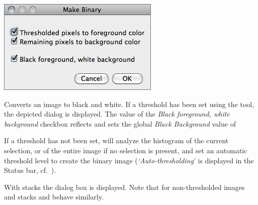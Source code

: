 \begin{minipage}[c][1\totalheight][t]{0.411\columnwidth}%
\includegraphics[scale=0.55]{images/MakeBinary}%
\end{minipage}%
\begin{minipage}[c][1\totalheight][t]{0.589\columnwidth}%
Converts an image to black and white. If a threshold has been set
using the 
tool, the depicted dialog is displayed. The value of the \emph{Black
foreground, white background} checkbox reflects and sets the global
\emph{Black Background} value of %
\end{minipage}\medskip{}


If a threshold has not been set, 
will analyze the histogram of the current selection, or of the entire
image if no selection is present, and set an automatic threshold level
to create the binary image (\emph{`Auto-thresholding}' is displayed
in the Status bar, cf.\ ). 

With stacks the  dialog
box is displayed. Note that for non-thresholded images and stacks
 and 
behave similarly.




\subsubsection{\protect{}\label{sub:Convert-to-Mask}}

